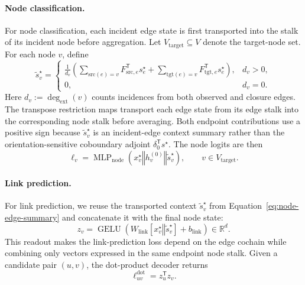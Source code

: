 \documentclass[sigconf,anonymous,review]{acmart}
\newcommand{\R}{\mathbb{R}}
\newcommand{\transpose}{\mathsf{T}}
\newcommand{\concat}{\mathbin\Vert}
\begin{document}
\paragraph{Node classification.}
For node classification, each incident edge state is first transported into
the stalk of its incident node before aggregation. Let
\(V_{\mathrm{target}}\subseteq V\) denote the target-node set. For each node
\(v\), define
\begin{equation}
\widetilde{s}_v^\star
=
\begin{cases}
\displaystyle
\frac{1}{d_v}
\left(
 \sum_{\mathrm{src}(e)=v}
 F_{\mathrm{src},e}^{\transpose}s_e^\star
 +
 \sum_{\mathrm{tgt}(e)=v}
 F_{\mathrm{tgt},e}^{\transpose}s_e^\star
\right),
& d_v>0, \\[10pt]
0,
& d_v=0 .
\end{cases}
\label{eq:node-edge-summary}
\end{equation}
Here $d_v := \deg_{\mathrm{ext}}(v)$ counts incidences from both observed and
closure edges. The transpose restriction maps transport each edge state
from its edge stalk into the corresponding node stalk before averaging.
Both endpoint contributions use a positive sign because
\(\widetilde{s}_v^\star\) is an incident-edge context summary rather than
the orientation-sensitive coboundary adjoint
\(\delta_0^{\transpose}s^\star\). The node logits are then
\begin{equation}
  \ell_v
  =
  \operatorname{MLP}_{\mathrm{node}}
  \left(
    x_v^\star\concat h_v^{(0)}\concat\widetilde{s}_v^\star
  \right),
  \qquad v\in V_{\mathrm{target}} .
  \label{eq:node-readout}
\end{equation}

\paragraph{Link prediction.}
For link prediction, we reuse the transported context
\(\widetilde{s}_v^\star\) from Equation~\eqref{eq:node-edge-summary} and
concatenate it with the final node state:
\[
  z_v=\operatorname{GELU}\!\left(
  W_{\mathrm{link}}
  [x_v^\star\concat\widetilde{s}_v^\star]
  +b_{\mathrm{link}}
  \right)\in\R^d .
\]
This readout makes the link-prediction loss depend on the edge cochain while
combining only vectors expressed in the same endpoint node stalk. Given a
candidate pair \((u,v)\), the dot-product decoder returns
\begin{equation}
  \ell_{uv}^{\mathrm{dot}}
  =
  z_u^{\transpose}z_v .
  \label{eq:link-dot}
\end{equation}
\end{document}
